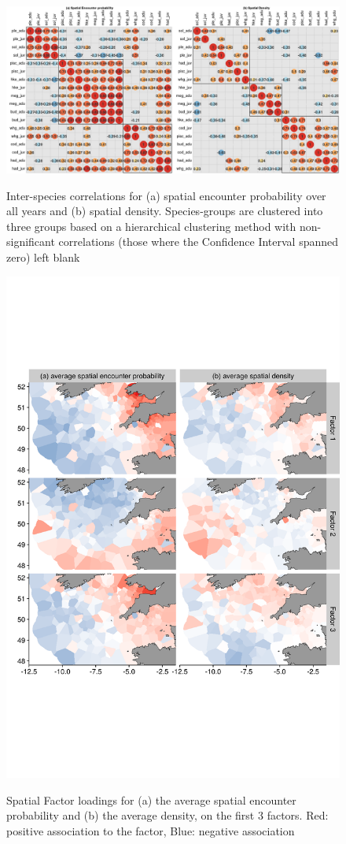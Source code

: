\documentclass{article}
\begin{document}
\begin{figure}
\begin{center}
	\includegraphics[width = \linewidth]{"Figure 1 - Omega1Omega2_Correlations_blank"}
	\label{fig:1}
	\caption{Inter-species correlations for (a) spatial encounter
		probability over all years and (b) spatial density.
		Species-groups are clustered into three groups based on a
		hierarchical clustering method with non-significant
		correlations (those where the Confidence Interval spanned zero)
		left blank}
	\end{center}
\end{figure}

\begin{figure}
\begin{center}
	\includegraphics[width=0.8\linewidth]{"Figure 2 - SpatialFactorLoadingsOmega1Omega2"}
	\label{fig:2}
	\caption{Spatial Factor loadings for (a) the average spatial encounter
		probability and (b) the average density,  on the first 3
		factors. Red: positive association to the factor, Blue:
		negative association}
\end{center}
\end{figure}
\end{document}
